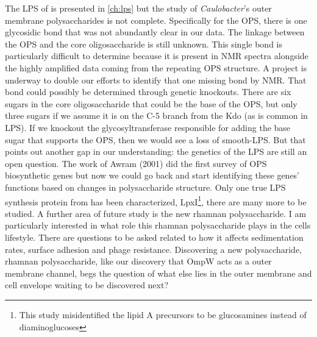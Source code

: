 The \ac{LPS} of \caulobacter{} is presented in \cref{ch:lps} but the study of \textit{Caulobacter}'s outer membrane polysaccharides is not complete. Specifically for the \ac{OPS}, there is one glycosidic bond that was not abundantly clear in our data. The linkage between the \ac{OPS} and the core oligosaccharide is still unknown. This  single bond is particularly difficult to determine because it is present in \ac{NMR} spectra alongside the highly amplified data coming from the repeating \ac{OPS} structure. A project is underway to double our efforts to identify that one missing bond by \ac{NMR}. That bond could possibly  be determined through genetic knockouts. There are six sugars in the core oligosaccharide that could be the base of the \ac{OPS}, but only three sugars if we assume it is on the C-5 branch from the Kdo (as is common in LPS). If we knockout the glycosyltransferase responsible for adding the base sugar that supports the \ac{OPS}, then we would see a loss of smooth-\ac{LPS}. But that points out another gap in our understanding: the genetics of the \caulobacter{} \ac{LPS} are still an open question. The work of Awram \etal{} (2001) did the first survey of \ac{OPS} biosynthetic genes but now we could go back and start identifying these genes' functions based on changes in polysaccharide structure. Only one true \ac{LPS} synthesis protein from \caulobacter{} has been characterized, LpxI\footnote{This study misidentified the lipid A precursors to be glucosamines instead of diaminoglucoses}, there are many more to be studied. A further area of future study is the new rhamnan polysaccharide. I am particularly interested in what role this rhamnan polysaccharide plays in the cells lifestyle. There are questions to be asked related to how it affects sedimentation rates, surface adhesion and phage resistance. Discovering a new polysaccharide, rhamnan polysaccharide, like our discovery that OmpW acts as a outer membrane channel, begs the question of what else lies in the outer membrane and cell envelope waiting to be discovered next?
